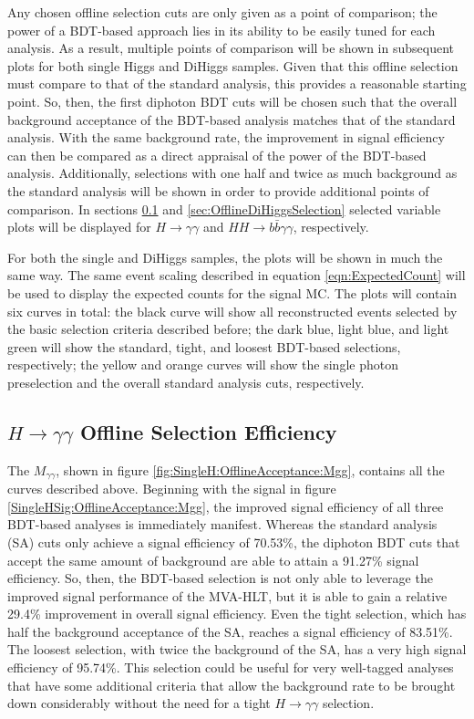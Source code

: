 \documentclass[12pt]{ucsddissertation}
\begin{document}
Any chosen offline selection cuts are only given as a point of comparison; the power of a BDT-based approach lies in its ability to be easily tuned for each analysis. As a result, multiple points of comparison will be shown in subsequent plots for both single Higgs and DiHiggs samples. Given that this offline selection must compare to that of the standard analysis, this provides a reasonable starting point. So, then, the first diphoton BDT cuts will be chosen such that the overall background acceptance of the BDT-based analysis matches that of the standard analysis. With the same background rate, the improvement in signal efficiency can then be compared as a direct appraisal of the power of the BDT-based analysis. Additionally, selections with one half and twice as much background as the standard analysis will be shown in order to provide additional points of comparison. In sections \ref{sec:OfflineSingleHSelection} and \ref{sec:OfflineDiHiggsSelection} selected variable plots will be displayed for $H \rightarrow \gamma \gamma$ and $HH \rightarrow b \bar{b} \gamma \gamma$, respectively.

For both the single and DiHiggs samples, the plots will be shown in much the same way. The same event scaling described in equation \ref{eqn:ExpectedCount} will be used to display the expected counts for the signal MC. The plots will contain six curves in total: the black curve will show all reconstructed events selected by the basic selection criteria described before; the dark blue, light blue, and light green will show the standard, tight, and loosest BDT-based selections, respectively; the yellow and orange curves will show the single photon preselection and the overall standard analysis cuts, respectively. 

\subsection{$H \rightarrow \gamma \gamma$ Offline Selection Efficiency}\label{sec:OfflineSingleHSelection}

The $M_{\gamma \gamma}$, shown in figure \ref{fig:SingleH:OfflineAcceptance:Mgg}, contains all  the curves described above. Beginning with the signal in figure \ref{SingleHSig:OfflineAcceptance:Mgg}, the improved signal efficiency of all three BDT-based analyses is immediately manifest. Whereas the standard analysis (SA) cuts only achieve a signal efficiency of 70.53\%, the diphoton BDT cuts that accept the same amount of background are able to attain a 91.27\% signal efficiency. So, then, the BDT-based selection is not only able to leverage the improved signal performance of the MVA-HLT, but it is able to gain a relative 29.4\% improvement in overall signal efficiency. Even the tight selection, which has half the background acceptance of the SA, reaches a signal efficiency of 83.51\%. The loosest selection, with twice the background of the SA, has a very high signal efficiency of 95.74\%. This selection could be useful for very well-tagged analyses that have some additional criteria that allow the background rate to be brought down considerably without the need for a tight $H \rightarrow \gamma \gamma$ selection.
\end{document}
